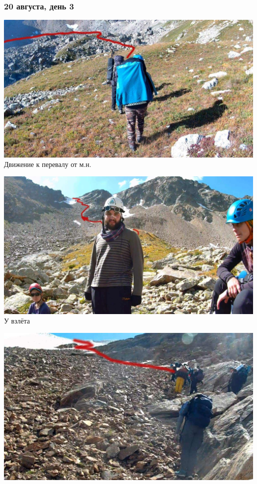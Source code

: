 \begin{frame}
	\frametitle{20 августа, день 3}
	{\tiny
		\begin{minipage}{\fourpicsize}
			\centering
			\includegraphics[width=\textwidth]{../pics/20aug1.jpg}			
			Движение к перевалу от м.н.
		\end{minipage}
		\hfill
		\begin{minipage}{\fourpicsize}
			\centering
			\includegraphics[width=\textwidth]{../pics/20aug2.jpg}			
			У взлёта
		\end{minipage}
		\vfill
		\begin{minipage}{\fourpicsize}
			\centering
			\includegraphics[width=\textwidth]{../pics/20aug3.jpg}			

\end{minipage}}
\end{frame}
